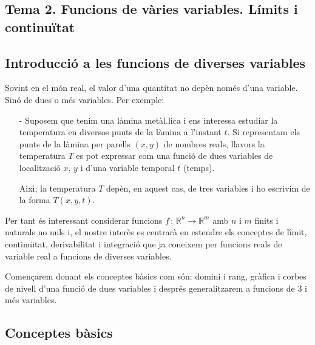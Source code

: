 \documentclass[12pt]{article}
\newcommand{\R}{\mathbb{R}}
\begin{document}
\pagestyle{fancy}
\fancyhead{}

\begin{center}
\section{Tema 2. Funcions de vàries variables. Límits i continuïtat}
\end{center}


\parskip =0.3cm
\parindent =0cm
\itemindent=2cm

\subsection{Introducci{\'o} a les funcions de diverses variables}

Sovint en el m{\'o}n real, el valor d'una quantitat no dep{\`e}n nom{\'e}s d'una variable.
Sin{\'o} de dues o m{\'e}s variables. Per exemple:
\begin{itemize}
\item[-] Suposem que tenim una l{\`a}mina met{\`a}l.lica i ens interessa estudiar la temperatura
en diversos punts de la l{\`a}mina a l'instant $t$. Si representam els punts de la l{\`a}mina per
parells $(x,y)$ de nombres reals, llavors la temperatura $T$ es pot expressar com una
funci{\'o} de dues variables de localitzaci{\'o} $x,\, y$ i d'una variable temporal $t$ (temps).

Aix{\'\i}, la temperatura $T$ dep{\`e}n, en aquest cas, de tres variables i ho escrivim de la
forma $T(x,y,t)$.
\end{itemize}

Per tant {\'e}s interessant considerar funcions
$f\, :\, \R^n \longrightarrow \R^m$ amb $n$ i $m$ finits i naturals no nuls i, el nostre
inter{\`e}s es centrar{\`a} en estendre els conceptes de l{\'\i}mit, continu{\"\i}tat, derivabilitat i integraci{\'o} que ja coneixem per funcions reals de variable real a funcions de diverses variables.

Comen\c{c}arem donant els conceptes b{\`a}sics com s{\'o}n: domini i
rang, gr{\`a}fica i corbes de nivell d'una funci{\'o} de dues
variables i despr{\'e}s generalitzarem a funcions de 3 i m{\'e}s
variables.

\subsection{Conceptes b{\`a}sics}
\end{document}
